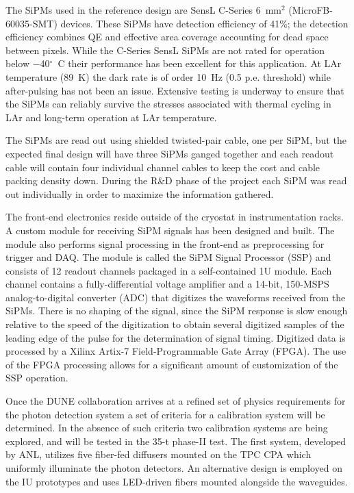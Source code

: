 The SiPMs used in the reference design are SensL C-Series 6~mm$^2$
(MicroFB-60035-SMT) devices. These SiPMs have detection efficiency of
41\%; the detection efficiency combines QE and effective area
  coverage accounting for dead space between pixels. While the
C-Series SensL SiPMs are not rated for operation below
$-$40$^{\circ}$~C their performance has been excellent for this
application. At LAr temperature (89~K) the dark rate is of order 10~Hz
(0.5 p.e. threshold) while after-pulsing has not been an
issue. Extensive testing is underway to ensure that the SiPMs can
reliably survive the stresses associated with thermal cycling in LAr
and long-term operation at LAr temperature.

The SiPMs are read out using shielded twisted-pair cable, one per SiPM,
but the expected final design will have three SiPMs ganged together and
each readout cable will contain four individual channel cables to keep
the cost and cable packing density down. During the R\&D phase of the
project each SiPM was read out individually in order to maximize the information
gathered.  

The front-end electronics reside outside of the cryostat in
instrumentation racks. A custom module for receiving SiPM signals has
been designed and built. The module also performs signal processing in
the front-end as preprocessing for trigger and DAQ.  The module is
called the SiPM Signal Processor (SSP) and consists of 12 readout
channels packaged in a self-contained 1U module.  Each channel
contains a fully-differential voltage amplifier and a 14-bit, 150-MSPS
analog-to-digital converter (ADC) that digitizes the waveforms
received from the SiPMs. There is no shaping of the signal, since the
SiPM response is slow enough relative to the speed of the digitization
to obtain several digitized samples of the leading edge of the pulse
for the determination of signal timing. Digitized data is processed by
a Xilinx Artix-7 Field-Programmable Gate Array (FPGA).  The use of the
FPGA processing allows for a significant amount of customization of
the SSP operation. 

Once the DUNE collaboration arrives at a refined set of physics
requirements for the photon detection system a set of criteria for a
calibration system will be determined. In the absence of such criteria
two calibration systems are being explored, and will be tested in
the 35-t phase-II test. The first system, developed by ANL, utilizes five
fiber-fed diffusers mounted on the TPC CPA which uniformly illuminate
the photon detectors. An alternative design is employed on the IU
prototypes and uses LED-driven fibers mounted alongside the
waveguides. 

